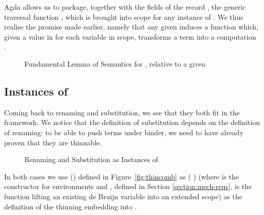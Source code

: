 


Agda allows us to package, together with the fields of the record
\semrec{}, the generic traversal function \semfun{}, which is brought
into scope for any instance of \semrec{}. We thus realise the promise
made earlier, namely that any given {\semrec{}  } induces
a function which, given a value in  for each variable in scope,
transforms a   term into a computation .

\begin{figure}[h]
\caption{Fundamental Lemma of Semantics for , relative to a given \semrec{}  }\label{figure:fdmlamsem}
\end{figure}

\subsection{Instances of }

Coming back to renaming and substitution, we see that they both fit in the
\semrec{} framework. We notice that the definition of substitution depends on
the definition of renaming: to be able to push terms under binder, we need to
have already proven that they are thinnable.

\begin{figure}[h]
\begin{minipage}{0.5\textwidth}
\end{minipage}\hfill
\begin{minipage}{0.5\textwidth}
\end{minipage}
\caption{Renaming and Substitution as Instances of \semrec{}}
\end{figure}

In both cases we use () defined in Figure~\ref{fig:thincomb} as
( ) (where  is the constructor for environments and
, defined in Section \ref{section:mech-reus}, is the function lifting an
existing de Bruijn variable into an extended scope) as the definition of the
thinning embedding \AB{$\Gamma$} into {\AB{$\sigma$} \AIC{::} \AB{$\Gamma$}}.

